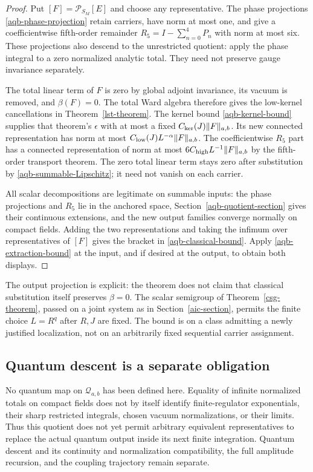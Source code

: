 \begin{proof}
Put $[F]=\mathcal P_{S_M}[E]$ and choose any representative.
The phase projections \eqref{aqb-phase-projection} retain carriers,
have norm at most one, and give a coefficientwise fifth-order
remainder $R_5=I-\sum_{n=0}^4P_n$ with norm at most six.
These projections also descend to the unrestricted quotient:
apply the phase integral to a zero normalized analytic total.
They need not preserve gauge invariance separately.

The total linear term of $F$ is zero by global adjoint invariance,
its vacuum is removed, and $\beta(F)=0$. The total Ward algebra
therefore gives the low-kernel cancellations in
Theorem~\ref{lst-theorem}. The kernel bound
\eqref{aqb-kernel-bound} supplies that theorem's $\epsilon$ with
at most a fixed $C_{\rm ker}(J)\|F\|_{a,b}$. Its new connected
representation has norm at most
$C_{\rm low}(J)L^{-\alpha}\|F\|_{a,b}$.
The coefficientwise $R_5$ part has a connected representation
of norm at most $6C_{\rm high}L^{-1}\|F\|_{a,b}$ by the
fifth-order transport theorem. The zero total linear term stays
zero after substitution by \eqref{aqb-summable-Lipschitz}; it
need not vanish on each carrier.

All scalar decompositions are legitimate on summable inputs:
the phase projections and $R_5$ lie in the anchored space,
Section~\ref{aqb-quotient-section} gives their continuous
extensions, and the new output families converge normally on
compact fields. Adding the two representations and taking the
infimum over representatives of $[F]$ gives the bracket in
\eqref{aqb-classical-bound}. Apply
\eqref{aqb-extraction-bound} at the input, and if desired at
the output, to obtain both displays.
\end{proof}

The output projection is explicit: the theorem does not claim
that classical substitution itself preserves $\beta=0$.
The scalar semigroup of Theorem~\ref{csg-theorem}, passed on
a joint system as in Section~\ref{aic-section}, permits the
finite choice $L=R^q$ after $R,J$ are fixed. The bound is on a
class admitting a newly justified localization, not on an
arbitrarily fixed sequential carrier assignment.

\subsection{Quantum descent is a separate obligation}
\label{aqb-scope}

No quantum map on $\mathcal Q_{a,b}$ has been defined here.
Equality of infinite normalized totals on compact fields does
not by itself identify finite-regulator exponentials, their
sharp restricted integrals, chosen vacuum normalizations, or
their limits. Thus this quotient does not yet permit arbitrary
equivalent representatives to replace the actual quantum output
inside its next finite integration. Quantum descent and its
continuity and normalization compatibility, the full amplitude
recursion, and the coupling trajectory remain separate.
